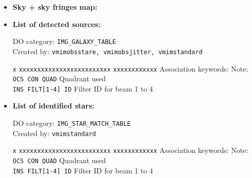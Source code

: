 \begin{itemize}
\item {\bf Sky + sky fringes map:}


\item {\bf List of detected sources:}

DO category: {\tt IMG\_GALAXY\_TABLE} \\
Created by: {\tt vmimobsstare, vmimobsjitter, vmimstandard}

\begin{tabbing}
{\tt x} \= {\tt xxxxxxxxxxxxxxxxxxxxxxxxx} \= {\tt xxxxxxxxxxxx} \kill
\> Association keywords: \> Note: \\
\> {\tt OCS CON QUAD} \> Quadrant used \\
\> {\tt INS FILT[1-4] ID} \> Filter ID for beam 1 to 4 \\
\end{tabbing}

\item {\bf List of identified stars:}

DO category: {\tt IMG\_STAR\_MATCH\_TABLE} \\
Created by: {\tt vmimstandard}

\begin{tabbing}
{\tt x} \= {\tt xxxxxxxxxxxxxxxxxxxxxxxxx} \= {\tt xxxxxxxxxxxx} \kill
\> Association keywords: \> Note: \\
\> {\tt OCS CON QUAD} \> Quadrant used \\
\> {\tt INS FILT[1-4] ID} \> Filter ID for beam 1 to 4 \\
\end{tabbing}



\end{itemize}
